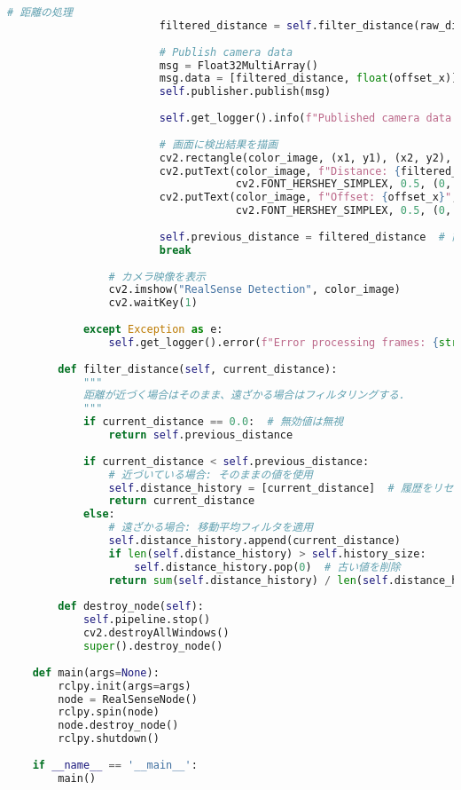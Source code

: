 \begin{lstlisting}[language=Python, caption=RealSense\_node.py]
                        # 距離の処理
                        filtered_distance = self.filter_distance(raw_distance)
    
                        # Publish camera data
                        msg = Float32MultiArray()
                        msg.data = [filtered_distance, float(offset_x)]
                        self.publisher.publish(msg)
    
                        self.get_logger().info(f"Published camera data: Distance={filtered_distance:.2f}, Offset={offset_x}")
    
                        # 画面に検出結果を描画
                        cv2.rectangle(color_image, (x1, y1), (x2, y2), (0, 255, 0), 2)
                        cv2.putText(color_image, f"Distance: {filtered_distance:.2f}m", (x1, y1 - 10),
                                    cv2.FONT_HERSHEY_SIMPLEX, 0.5, (0, 255, 0), 2)
                        cv2.putText(color_image, f"Offset: {offset_x}", (x1, y1 - 30),
                                    cv2.FONT_HERSHEY_SIMPLEX, 0.5, (0, 255, 0), 2)
    
                        self.previous_distance = filtered_distance  # 前回の距離を更新
                        break
    
                # カメラ映像を表示
                cv2.imshow("RealSense Detection", color_image)
                cv2.waitKey(1)
    
            except Exception as e:
                self.get_logger().error(f"Error processing frames: {str(e)}")
    
        def filter_distance(self, current_distance):
            """
            距離が近づく場合はそのまま、遠ざかる場合はフィルタリングする.
            """
            if current_distance == 0.0:  # 無効値は無視
                return self.previous_distance
    
            if current_distance < self.previous_distance:
                # 近づいている場合: そのままの値を使用
                self.distance_history = [current_distance]  # 履歴をリセット
                return current_distance
            else:
                # 遠ざかる場合: 移動平均フィルタを適用
                self.distance_history.append(current_distance)
                if len(self.distance_history) > self.history_size:
                    self.distance_history.pop(0)  # 古い値を削除
                return sum(self.distance_history) / len(self.distance_history)
    
        def destroy_node(self):
            self.pipeline.stop()
            cv2.destroyAllWindows()
            super().destroy_node()
    
    def main(args=None):
        rclpy.init(args=args)
        node = RealSenseNode()
        rclpy.spin(node)
        node.destroy_node()
        rclpy.shutdown()
    
    if __name__ == '__main__':
        main()
\end{lstlisting}

